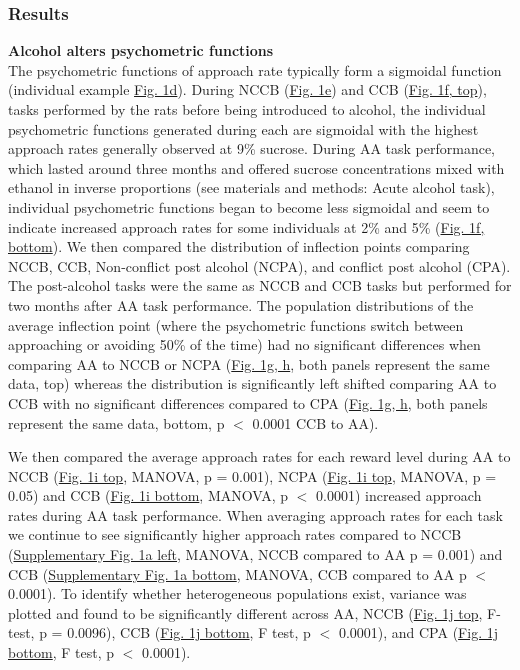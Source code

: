 \documentclass{article}
\begin{document}
\subsubsection{Results}
\noindent\textbf{Alcohol alters psychometric functions}\\
The psychometric functions of approach rate typically form a sigmoidal function (individual example \hyperref[fig:alcohol_main_1]{Fig. 1d}). During NCCB (\hyperref[fig:alcohol_main_1]{Fig. 1e}) and CCB (\hyperref[fig:alcohol_main_1]{Fig. 1f, top}), tasks performed by the rats before being introduced to alcohol, the individual psychometric functions generated during each are sigmoidal with the highest approach rates generally observed at 9\% sucrose. During AA task performance, which lasted around three months and offered sucrose concentrations mixed with ethanol in inverse proportions (see materials and methods: Acute alcohol task), individual psychometric functions began to become less sigmoidal and seem to indicate increased approach rates for some individuals at 2\% and 5\% (\hyperref[fig:alcohol_main_1]{Fig. 1f, bottom}). We then compared the distribution of inflection points comparing NCCB, CCB, Non-conflict post alcohol (NCPA), and conflict post alcohol (CPA). The post-alcohol tasks were the same as NCCB and CCB tasks but performed for two months after AA task performance. The population distributions of the average inflection point (where the psychometric functions switch between approaching or avoiding 50\% of the time) had no significant differences when comparing AA to NCCB or NCPA (\hyperref[fig:alcohol_main_1]{Fig. 1g, h}, both panels represent the same data, top) whereas the distribution is significantly left shifted comparing AA to CCB with no significant differences compared to CPA (\hyperref[fig:alcohol_main_1]{Fig. 1g, h}, both panels represent the same data, bottom, p $<$ 0.0001 CCB to AA).

\vspace{1em}

We then compared the average approach rates for each reward level during AA to NCCB (\hyperref[fig:alcohol_main_1]{Fig. 1i top}, MANOVA, p = 0.001), NCPA (\hyperref[fig:alcohol_main_1]{Fig. 1i top}, MANOVA, p = 0.05) and CCB (\hyperref[fig:alcohol_main_1]{Fig. 1i bottom}, MANOVA, p $<$ 0.0001) increased approach rates during AA task performance. When averaging approach rates for each task we continue to see significantly higher approach rates compared to NCCB (\hyperref[fig:Alcohol_SI_1]{Supplementary Fig. 1a left}, MANOVA, NCCB compared to AA p = 0.001) and CCB (\hyperref[fig:Alcohol_SI_1]{Supplementary Fig. 1a bottom}, MANOVA, CCB compared to AA p $<$ 0.0001). To identify whether heterogeneous populations exist, variance was plotted and found to be significantly different across AA, NCCB (\hyperref[fig:alcohol_main_1]{Fig. 1j top}, F-test, p = 0.0096), CCB (\hyperref[fig:alcohol_main_1]{Fig. 1j bottom}, F test, p $<$ 0.0001), and CPA (\hyperref[fig:alcohol_main_1]{Fig. 1j bottom}, F test, p $<$ 0.0001).
\end{document}
